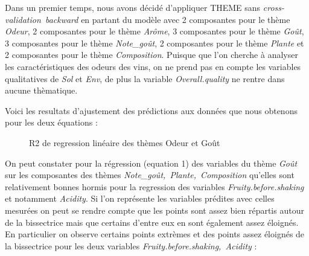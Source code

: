\documentclass[a4paper,french,10pt]{article}
\begin{document}
Dans un premier temps, nous avons décidé d'appliquer THEME sans \textit{cross-validation~backward} en partant du modèle avec 2 composantes pour le thème \textit{Odeur}, 2 composantes pour le thème \textit{Arôme}, 3 composantes pour le thème \textit{Goût}, 3 composantes pour le thème \textit{Note\_goût}, 2 composantes pour le thème \textit{Plante} et 2 composantes pour le thème \textit{Composition}. Puisque que l'on cherche à analyser les caractéristiques des odeurs des vins, on ne prend pas en compte les variables qualitatives de \textit{Sol} et \textit{Env}, de plus la variable \textit{Overall.quality} ne rentre dans aucune thèmatique. \newline

Voici les resultats d'ajustement des prédictions aux données que nous obtenons pour les deux équations : 

\begin{figure}[htp] 
	\centering
	\hfill%
	\caption{R2 de regression linéaire des thèmes Odeur et Goût}
\end{figure}

On peut constater pour la régression (equation 1) des variables du thème \textit{Goût} sur les composantes des thèmes \textit{Note\_goût,~Plante,~Composition} qu'elles sont relativement bonnes hormis pour la regression des variables \textit{Fruity.before.shaking} et notamment \textit{Acidity}. Si l'on représente les variables prédites avec celles mesurées on peut se rendre compte que les points sont assez bien répartis autour de la bissectrice mais que certains d'entre eux en sont également assez éloignés. En particulier on observe certains points extrèmes et des points assez éloignés de la bissectrice pour les deux variables \textit{Fruity.before.shaking,~Acidity} :
\end{document}
